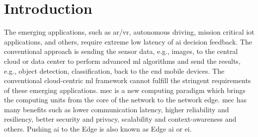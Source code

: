 \hypertarget{inroduction}{%
\chapter{Introduction}\label{sec:introduction}}
\thispagestyle{fancy}

The emerging applications, such as \gls{ar}/\gls{vr}, autonomous driving, mission critical \gls{iot} applications, and others, require extreme low latency of \gls{ai} decision feedback. The conventional approach is sending the sensor data, e.g., images, to the central cloud or data center to perform advanced \gls{ml} algorithms and send the results, e.g., object detection, classification, back to the end mobile devices. The conventional cloud-centric \gls{ml} framework cannot fulfill the stringent requirements of these emerging applications. \gls{mec} is a new computing paradigm which brings the computing units from the core of the network to the network edge. \gls{mec} has many benefits such as lower communication latency, higher reliability and resiliency, better security and privacy, scalability and context-awareness and others. Pushing \gls{ai} to the Edge is also known as Edge \gls{ai} or \gls{ei}.

